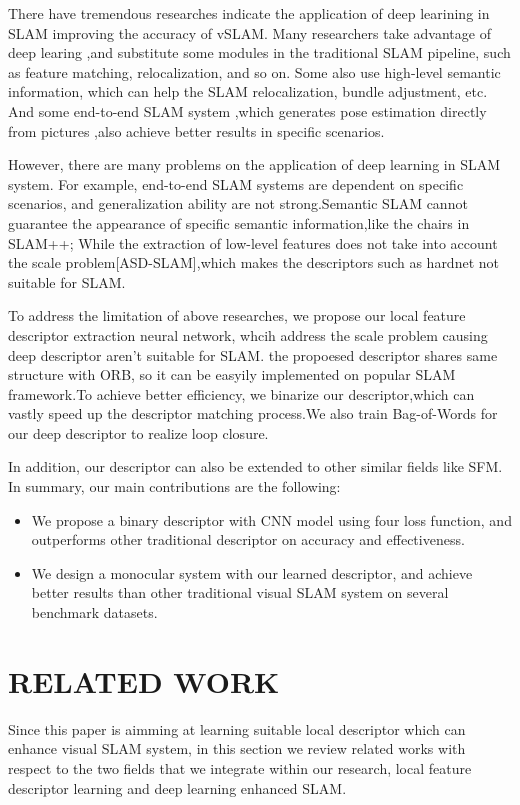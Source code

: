 \documentclass[conference]{IEEEtran}
\begin{document}
There have tremendous researches indicate the application of deep learining in SLAM improving the accuracy of vSLAM. Many researchers take advantage of deep learing ,and substitute some modules in the traditional SLAM pipeline, such as feature matching, relocalization, and so on. Some also use high-level semantic information, which can help the SLAM relocalization, bundle adjustment, etc. And some end-to-end SLAM system  ,which generates pose estimation directly from pictures ,also achieve better results in specific scenarios.

However, there are many problems on the application of deep learning in SLAM system. For example, end-to-end SLAM systems are dependent on specific scenarios, and generalization ability are not strong.Semantic SLAM cannot guarantee the  appearance of specific semantic information,like the chairs in SLAM++; While the extraction of low-level features does not take into account the scale problem[ASD-SLAM],which makes the descriptors such as hardnet not suitable for SLAM.

To address the limitation of above researches, we propose our local feature descriptor extraction neural network, whcih address the scale problem causing deep descriptor aren't suitable for SLAM. the propoesed descriptor shares same structure with ORB, so it can be  easyily implemented on popular SLAM framework.To achieve better efficiency, we binarize our descriptor,which can vastly speed up the descriptor matching process.We also train Bag-of-Words for our deep descriptor to realize loop closure. 

In addition, our descriptor can also be extended to other similar fields like SFM. In summary, our main contributions are the following:
\begin{itemize}
\item We propose a binary descriptor with CNN model using four loss function, and outperforms other traditional descriptor on accuracy and effectiveness. 
\item We design a monocular system with our learned descriptor, and achieve better results than other traditional visual SLAM system on several benchmark datasets.
\end{itemize}

\section{RELATED WORK}
Since this paper is aimming at learning suitable local descriptor which can enhance visual SLAM system, in this section we review related works with respect to the two fields that we integrate within our research, local feature descriptor learning and deep learning enhanced SLAM.
\end{document}

